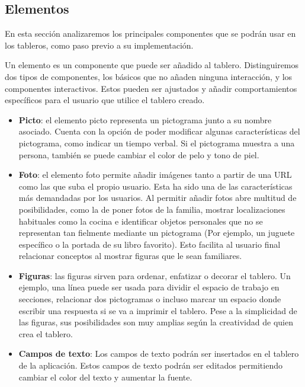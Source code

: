 \subsection{Elementos}


En esta sección analizaremos los principales componentes que se podrán usar en los tableros, como paso previo a su implementación.

Un elemento es un componente que puede ser añadido al tablero. Distinguiremos dos tipos de componentes, los básicos que no añaden ninguna interacción, y los componentes interactivos. Estos pueden ser ajustados y añadir comportamientos específicos para el usuario que utilice el tablero creado.

\begin{itemize}
	
	
	\item \textbf{Picto}: el elemento picto representa un pictograma junto a su nombre asociado. Cuenta con la opción de poder modificar algunas características del pictograma, como indicar un tiempo verbal. Si el pictograma muestra a una persona, también se puede cambiar el color de pelo y tono de piel.
	
	\item \textbf{Foto}: el elemento foto permite añadir imágenes tanto a partir de una URL como las que suba el propio usuario. Esta ha sido una de las características más demandadas por los usuarios. Al permitir añadir fotos abre multitud de posibilidades, como la de poner fotos de la familia, mostrar localizaciones habituales como la cocina e identificar objetos personales que no se representan tan fielmente mediante un pictograma (Por ejemplo, un juguete específico o la portada de su  libro favorito). Esto facilita al usuario final relacionar conceptos al mostrar figuras que le sean familiares.
	
	\item \textbf{Figuras}: las figuras sirven para ordenar, enfatizar o decorar el tablero. Un ejemplo,  una línea puede ser usada para dividir el espacio de trabajo en secciones, relacionar dos pictogramas o incluso marcar un espacio donde escribir una respuesta si se va a imprimir el tablero. Pese a la simplicidad de las figuras, sus posibilidades son muy amplias según  la creatividad de quien crea el tablero.
	
	\item \textbf{Campos de texto}: Los campos de texto podrán ser insertados en el tablero de la aplicación. Estos campos de texto podrán ser editados permitiendo cambiar el color del texto y aumentar la fuente.
	

\end{itemize}
